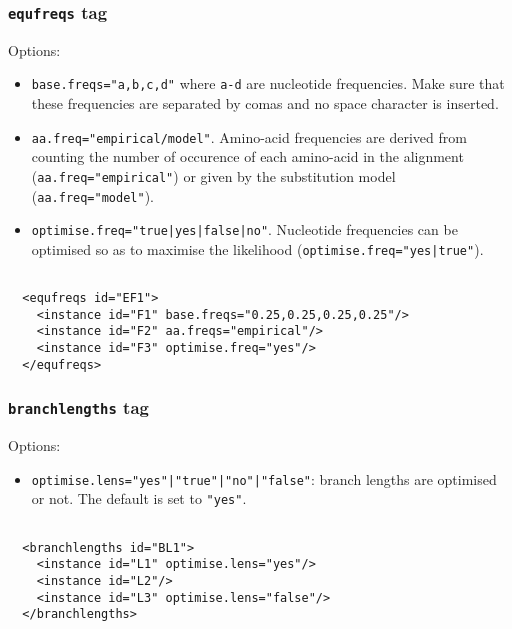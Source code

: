 \documentclass[a4paper,12pt]{article}
\newcommand{\x}[1]{\texttt{#1}}
\begin{document}
\subsubsection{{\tt equfreqs} tag}
Options:
\begin{itemize}
\item \x{base.freqs="a,b,c,d"} where \x{a-d} are nucleotide frequencies. Make sure that these
  frequencies are separated by comas and no space character is inserted.
\item \x{aa.freq="empirical/model"}. Amino-acid frequencies are derived from counting the number of
  occurence of each amino-acid in the alignment (\x{aa.freq="empirical"}) or given by the
  substitution model (\x{aa.freq="model"}).
\item \x{optimise.freq="true|yes|false|no"}. Nucleotide frequencies can be optimised so as to maximise
  the likelihood (\x{optimise.freq="yes|true"}).
\end{itemize}
\vspace{0.2cm}
\begin{Verbatim}[frame=single, label=Example of `equfreqs' tag, samepage=true, baselinestretch=0.5]

  <equfreqs id="EF1">
    <instance id="F1" base.freqs="0.25,0.25,0.25,0.25"/>
    <instance id="F2" aa.freqs="empirical"/>
    <instance id="F3" optimise.freq="yes"/>
  </equfreqs>

\end{Verbatim}

\subsubsection{{\tt branchlengths} tag}
Options:
\begin{itemize}
\item \x{optimise.lens="yes"|"true"|"no"|"false"}: branch lengths are optimised or not. The default
  is set to \x{"yes"}.
\end{itemize}
\vspace{0.2cm}
\begin{Verbatim}[frame=single, label=Example of `branchlengths' tag, baselinestretch=0.5]

  <branchlengths id="BL1">
    <instance id="L1" optimise.lens="yes"/>
    <instance id="L2"/>
    <instance id="L3" optimise.lens="false"/>
  </branchlengths>

\end{Verbatim}
\end{document}
